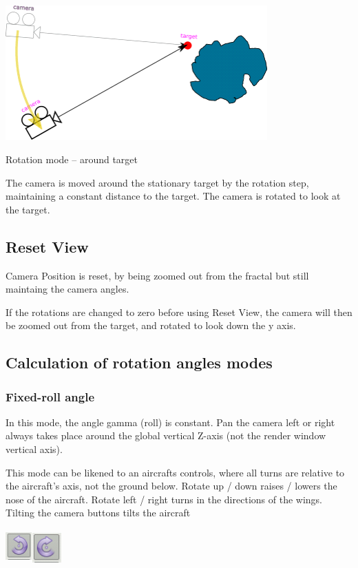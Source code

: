 \includegraphics[width=3.95347in,height=2.03472in]{img/manual/media/image15.png}

Rotation mode -- around target

The camera is moved around the stationary target by the rotation step,
maintaining a constant distance to the target. The camera is rotated to
look at the target.

\subsection{Reset View}\label{reset-view}

Camera Position is reset, by being zoomed out from the fractal but still
maintaing the camera angles.

If the rotations are changed to zero before using Reset View, the camera
will then be zoomed out from the target, and rotated to look down the y
axis.

\subsection{Calculation of rotation angles
modes}\label{calculation-of-rotation-angles-modes}

\subsubsection{Fixed-roll angle}\label{fixed-roll-angle}

In this mode, the angle gamma (roll) is constant. Pan the camera left or
right always takes place around the global vertical Z-axis (not the
render window vertical axis).

This mode can be likened to an aircrafts controls, where all turns are
relative to the aircraft's axis, not the ground below. Rotate up / down
raises / lowers the nose of the aircraft. Rotate left / right turns in
the directions of the wings. Tilting the camera buttons tilts the
aircraft

\includegraphics[width=0.40000in,height=0.50000in]{img/manual/media/image16.png}\includegraphics[width=0.45347in,height=0.45347in]{img/manual/media/image17.png}

